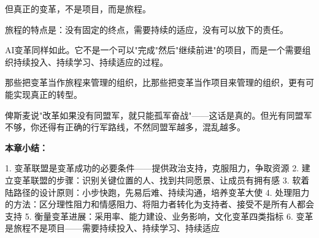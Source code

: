 但真正的变革，不是项目，而是旅程。

旅程的特点是：没有固定的终点，需要持续的适应，没有可以放下的责任。

AI变革同样如此。它不是一个可以"完成"然后"继续前进"的项目，而是一个需要组织持续投入、持续学习、持续适应的过程。

那些把变革当作旅程来管理的组织，比那些把变革当作项目来管理的组织，更有可能实现真正的转型。

俾斯麦说"改革如果没有同盟军，就只能孤军奋战"——这话是真的。但光有同盟军不够，你还得有正确的行军路线，不然同盟军越多，混乱越多。


\textbf{本章小结：}

1. 变革联盟是变革成功的必要条件——提供政治支持，克服阻力，争取资源
2. 建立变革联盟的步骤：识别关键位置的人、找到共同愿景、让成员有拥有感
3. 软着陆路径的设计原则：小步快跑，先易后难、持续沟通，培养变革大使
4. 处理阻力的方法：区分理性阻力和情感阻力、将阻力者转化为支持者、接受不是所有人都会支持
5. 衡量变革进展：采用率、能力建设、业务影响，文化变革四类指标
6. 变革是旅程不是项目——需要持续投入、持续学习、持续适应
